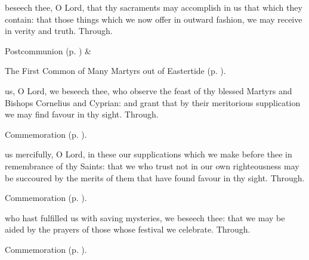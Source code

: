 \postcommunion
{} beseech thee, O Lord, that thy sacraments may accomplish in us that which they contain: that those things which we now offer in outward fashion, we may receive in verity and truth. Through.
\begin{rubric}
     Postcommunion  (p. \pageref{SPSaints}) \&  
\end{rubric}


\clearpage
{}

\begin{rubric}
	The First Common of Many Martyrs out of Eastertide (p. \pageref{CommonMartyrsI}).
\end{rubric}

\collect
{} us, O Lord, we beseech thee, who observe the feast of thy blessed Martyrs and Bishops Cornelius and Cyprian: and grant that by their meritorious supplication we may find favour in thy sight. Through.

\begin{rubric}
    Commemoration  (p. \pageref{EuphemiaCollect}).
\end{rubric}

\secret
{} us mercifully, O Lord, in these our supplications which we make before thee in remembrance of thy Saints: that we who trust not in our own righteousness may be succoured by the merits of them that have found favour in thy sight. Through.

\begin{rubric}
    Commemoration  (p. \pageref{EuphemiaSecret}).
\end{rubric}

\postcommunion
{} who hast fulfilled us with saving mysteries, we beseech thee: that we may be aided by the prayers of those whose festival we celebrate. Through.

\begin{rubric}
    Commemoration  (p. \pageref{EuphemiaPostcommunion}).
\end{rubric}



